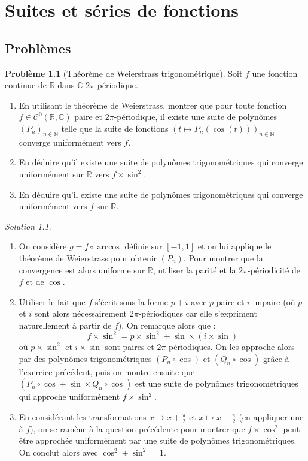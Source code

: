 \documentclass[french]{book}
\newcommand{\N}{\mathbb{N}}
\newcommand{\R}{\mathbb{R}}
\newcommand{\C}{\mathbb{C}}
\theoremstyle{definition}
\newtheorem{pro}{Problème}[chapter]
\theoremstyle{remark}
\newtheorem*{sol}{Solution}
\begin{document}
\chapter{Suites et séries de fonctions}

\section{Problèmes}

\begin{pro}[Théorème de Weierstrass trigonométrique]
	Soit $f$ une fonction continue de $\R$ dans $\C$ $2\pi$-périodique.
	\begin{enumerate}
		\item En utilisant le théorème de Weierstrass, montrer que pour toute fonction $f\in\mathcal{C}^0(\R,\C)$ paire et $2\pi$-périodique, il existe une suite de polynômes $(P_n)_{n\in\N}$ telle que la suite de fonctions $(t\mapsto P_n(\cos(t)))_{n\in\N}$ converge uniformément vers $f$.
		\item En déduire qu'il existe une suite de polynômes trigonométriques qui converge uniformément sur $\R$ vers $f\times\sin^2$.
		\item En déduire qu'il existe une suite de polynômes trigonométriques qui converge uniformément vers $f$ sur $\R$.
	\end{enumerate}
\end{pro}
\begin{sol}
	\begin{enumerate}
		\item On considère $g=f\circ\arccos$ définie sur $[-1,1]$ et on lui applique le théorème de Weierstrass pour obtenir $(P_n)$. Pour montrer que la convergence est alors uniforme sur $\R$, utiliser la parité et la $2\pi$-périodicité de $f$ et de $\cos$.
		\item Utiliser le fait que $f$ s'écrit sous la forme $p+i$ avec $p$ paire et $i$ impaire (où $p$ et $i$ sont alors nécessairement $2\pi$-périodiques car elle s'expriment naturellement à partir de $f$). On remarque alors que : $$f\times\sin^2=p\times\sin^2+\sin\times(i\times\sin)$$ où $p\times\sin^2$ et $i\times\sin$ sont paires et $2\pi$ périodiques. On les approche alors par des polynômes trigonométriques $(P_n\circ\cos)$ et $(Q_n\circ\cos)$ grâce à l'exercice précédent, puis on montre ensuite que $(P_n\circ\cos+\sin\times Q_n\circ\cos)$ est une suite de polynômes trigonométriques qui approche uniformément $f\times\sin^2$.
		\item En considérant les transformations $x\mapsto x+\displaystyle\frac{\pi}{2}$ et $x\mapsto x-\displaystyle\frac{\pi}{2}$ (en appliquer une à $f$), on se ramène à la question précédente pour montrer que $f\times\cos^2$ peut être approchée uniformément par une suite de polynômes trigonométriques. On conclut alors avec $\cos^2+\sin^2=1$.
	\end{enumerate}
\end{sol}
\end{document}
